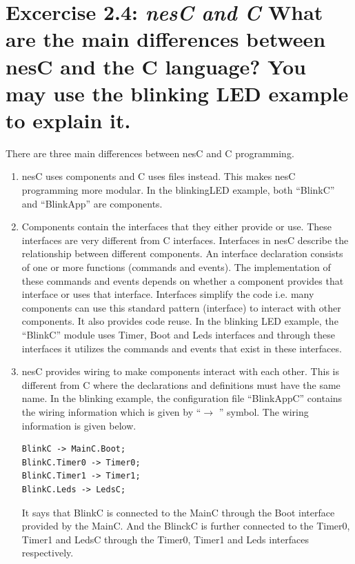 \documentclass[11pt]{article} %
\begin{document}
\section*{Excercise 2.4: \textnormal{\large{\textit{nesC and C} What are the main differences between nesC and
the C language? You may use the blinking LED example to explain it.}}}
There are three main differences between nesC and C programming.
\begin{enumerate}
\item nesC uses components and C uses files instead. This makes nesC programming more modular. In the blinkingLED example, both ``BlinkC'' and ``BlinkApp'' are components.

\item Components contain the interfaces that they either provide or use. These interfaces are very different from C interfaces. Interfaces in nesC describe the relationship between different components. An interface declaration consists of one or more functions (commands and events). The implementation of these commands and events depends on whether a component provides that interface or uses that interface. Interfaces simplify the code i.e. many components can use this standard pattern (interface) to interact with other components. It also provides code reuse. In the blinking LED example, the ``BlinkC'' module uses Timer, Boot and Leds interfaces and through these interfaces it utilizes the commands and events that exist in these interfaces.

\item nesC provides wiring to make components interact with each other. This is different from C where the declarations and definitions must have the same name. In the blinking example, the configuration file ``BlinkAppC'' contains the wiring information which is given by ``$\rightarrow$ '' symbol. The wiring information is given below.

\begin{lstlisting}[frame=single]
BlinkC -> MainC.Boot; 
BlinkC.Timer0 -> Timer0;
BlinkC.Timer1 -> Timer1;
BlinkC.Leds -> LedsC;
\end{lstlisting}
It says that BlinkC is connected to the MainC through the Boot interface provided by the MainC. And the BlinckC is further connected to the Timer0, Timer1 and LedsC through the Timer0, Timer1 and Leds interfaces respectively.

\end{enumerate}
\end{document}
